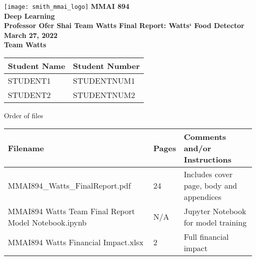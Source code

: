 \begin{titlepage}
  \raggedleft
  \texttt{[image: smith\_mmai\_logo]}
  \centering
  \vfill
  {\bfseries\large
    MMAI 894\\
    Deep Learning\\
    \vskip0.5cm
    Professor Ofer Shai 
    \vskip1cm
    Team Watts Final Report: Watts` Food Detector\\
    March 27, 2022\\
  }
  \vskip0.5cm
  \textbf{Team Watts} \\
  \vskip0.2cm
  \begin{tabular}{|l|l|}
	\hline
	Student Name & Student Number \\
	\hline
	  STUDENT1 & STUDENTNUM1 \\
	  STUDENT2 & STUDENTNUM2 \\
	\hline
  \end{tabular}
  \vskip0.4cm
Order of files
  \vskip0.2cm
{\renewcommand{\arraystretch}{1.5}
	\begin{tabular}{|p{2.5in}|p{.5in}|p{2.5in}|}
	\hline
	Filename & Pages & Comments and/or Instructions \\
	\hline
	MMAI894\_Watts\_FinalReport.pdf & 24 & Includes cover page, body and appendices \\
	MMAI894 Watts Team Final Report Model Notebook.ipynb & N/A & Jupyter Notebook for model training \\
	MMAI894 Watts Financial Impact.xlsx & 2 & Full financial impact \\
	\hline
\end{tabular}}
\vfill
\end{titlepage}

